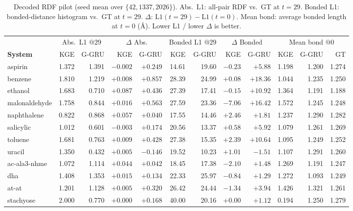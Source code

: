 \documentclass{article}
\newcommand{\GKE}{\textsc{KGE}}
\newcommand{\GGRU}{\textsc{G-GRU}}
\begin{document}
\begin{table}[H]
\centering
\caption{Decoded RDF pilot (seed mean over $\{42,1337,2026\}$). Abs.\ L1: all-pair RDF vs.\ GT at $t{=}29$. Bonded L1: bonded-distance histogram vs.\ GT at $t{=}29$. $\Delta$: $\mathrm{L1}(t{=}29)-\mathrm{L1}(t{=}0)$. Mean bond: average bonded length at $t{=}0$ (\AA). Lower L1 / lower $\Delta$ is better.}
\label{tab:rdf_pilot_numbers}
{\footnotesize
\setlength{\tabcolsep}{3pt}
\begin{tabular}{l rr rr rr rr rrr}
\toprule
 & \multicolumn{2}{c}{Abs.\ L1 $@29$} & \multicolumn{2}{c}{$\Delta$ Abs.} & \multicolumn{2}{c}{Bonded L1 $@29$} & \multicolumn{2}{c}{$\Delta$ Bonded} & \multicolumn{3}{c}{Mean bond $@0$} \\
\cmidrule(lr){2-3}\cmidrule(lr){4-5}\cmidrule(lr){6-7}\cmidrule(lr){8-9}\cmidrule(lr){10-12}
\textbf{System} & \GKE{} & \GGRU{} & \GKE{} & \GGRU{} & \GKE{} & \GGRU{} & \GKE{} & \GGRU{} & \GKE{} & \GGRU{} & GT \\
\midrule
aspirin & 1.372 & 1.391 & $-0.002$ & $+0.249$ & 14.61 & 19.60 & $-0.23$ & $+5.88$ & 1.198 & 1.200 & 1.274 \\
benzene & 1.810 & 1.219 & $+0.008$ & $+0.857$ & 28.39 & 24.99 & $+0.08$ & $+18.36$ & 1.044 & 1.235 & 1.250 \\
ethanol & 1.683 & 0.710 & $+0.087$ & $+0.436$ & 27.39 & 17.41 & $-0.15$ & $+10.92$ & 1.364 & 1.191 & 1.188 \\
malonaldehyde & 1.758 & 0.844 & $+0.016$ & $+0.563$ & 27.59 & 23.36 & $-7.06$ & $+16.42$ & 1.572 & 1.245 & 1.248 \\
naphthalene & 0.822 & 0.868 & $+0.057$ & $+0.040$ & 17.55 & 14.46 & $+2.46$ & $+1.81$ & 1.237 & 1.290 & 1.282 \\
salicylic & 1.012 & 0.601 & $-0.003$ & $+0.174$ & 20.56 & 13.37 & $+0.58$ & $+5.92$ & 1.079 & 1.261 & 1.269 \\
toluene & 1.681 & 0.763 & $+0.009$ & $+0.428$ & 27.38 & 15.35 & $+2.39$ & $+10.64$ & 1.095 & 1.249 & 1.252 \\
uracil & 1.350 & 0.432 & $+0.005$ & $-0.146$ & 19.52 & 10.23 & $+1.01$ & $-1.51$ & 1.107 & 1.291 & 1.260 \\
ac-ala3-nhme & 1.072 & 1.114 & $+0.044$ & $+0.042$ & 18.45 & 17.38 & $-2.10$ & $+1.48$ & 1.269 & 1.191 & 1.247 \\
dha & 1.408 & 1.353 & $+0.015$ & $+0.134$ & 22.33 & 25.97 & $-0.84$ & $+1.29$ & 1.272 & 1.093 & 1.249 \\
at-at & 1.201 & 1.128 & $+0.005$ & $+0.320$ & 26.42 & 24.44 & $-1.34$ & $+3.94$ & 1.426 & 1.321 & 1.261 \\
stachyose & 2.000 & 0.770 & $+0.000$ & $+0.168$ & 40.00 & 20.16 & $+0.00$ & $+1.12$ & 0.194 & 1.250 & 1.279 \\
\bottomrule
\end{tabular}}
\end{table}
\end{document}
